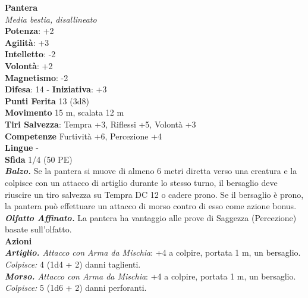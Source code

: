 \begin{multicols}{2}
\medskip\textbf{Pantera}\\
\emph{Media bestia, disallineato}\\
\textbf{Potenza}: +2\\
\textbf{Agilità}: +3\\
\textbf{Intelletto}: -2\\
\textbf{Volontà}: +2\\
\textbf{Magnetismo}: -2\\
\textbf{Difesa}: 14 - \textbf{Iniziativa}: +3\\
\textbf{Punti Ferita} 13 (3d8)\\
\textbf{Movimento} 15 m, scalata 12 m\\
\textbf{Tiri Salvezza}: Tempra +3, Riflessi +5, Volontà +3 \\
\textbf{Competenze} Furtività +6, Percezione +4\\
\textbf{Lingue} -\\
\textbf{Sfida} 1/4 (50 PE)\smallskip\\
\emph{\textbf{Balzo.}} Se la pantera si muove di almeno 6 metri diretta verso una creatura e la colpisce con un attacco di artiglio durante lo stesso turno, il bersaglio deve riuscire un tiro salvezza su Tempra DC 12 o cadere prono. Se il bersaglio è prono, la pantera può effettuare un attacco di morso contro di esso come azione bonus.\\
\emph{\textbf{Olfatto Affinato.}} La pantera ha vantaggio alle prove di Saggezza (Percezione) basate sull'olfatto.\\
\smallskip\textbf{Azioni}\\
\emph{\textbf{Artiglio.} Attacco con Arma da Mischia}: +4 a colpire, portata 1 m, un bersaglio.\\
\emph{Colpisce:} 4 (1d4 + 2) danni taglienti.\\
\emph{\textbf{Morso.} Attacco con Arma da Mischia}: +4 a colpire, portata 1 m, un bersaglio.\\
\emph{Colpisce:} 5 (1d6 + 2) danni perforanti.\\


\end{multicols}

